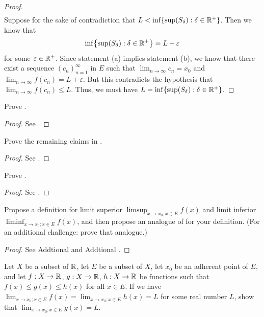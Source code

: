 \begin{proof}
\begin{align*}
  \end{align*}
  Suppose for the sake of contradiction that \(L < \inf\set{\sup(S_\delta) : \delta \in \R^+}\).
  Then we know that
  \[
    \inf\set{\sup(S_\delta) : \delta \in \R^+} = L + \varepsilon
  \]
  for some \(\varepsilon \in \mathbb{R}^+\).
  Since statement (a) implies statement (b), we know that there exist a sequence \((c_n)_{n = 1}^\infty\) in \(E\) such that \(\lim_{n \to \infty} c_n = x_0\) and \(\lim_{n \to \infty} f(c_n) = L + \varepsilon\).
  But this contradicts the hypothesis that \(\lim_{n \to \infty} f(c_n) \leq L\).
  Thus, we must have \(L = \inf\set{\sup(S_{\delta}) : \delta \in \R^+}\).
\end{proof}

\exercisesection

\begin{ex}\label{i:ex:9.3.1}
  Prove .
\end{ex}

\begin{proof}
  See .
\end{proof}

\begin{ex}\label{i:ex:9.3.2}
  Prove the remaining claims in .
\end{ex}

\begin{proof}
  See .
\end{proof}

\begin{ex}\label{i:ex:9.3.3}
  Prove .
\end{ex}

\begin{proof}
  See .
\end{proof}

\begin{ex}\label{i:ex:9.3.4}
  Propose a definition for limit superior \(\limsup_{x \to x_0 ; x \in E} f(x)\) and limit inferior \(\liminf_{x \to x_0 ; x \in E} f(x)\), and then propose an analogue of  for your definition.
  (For an additional challenge: prove that analogue.)
\end{ex}

\begin{proof}
  See Addtional  and Addtional .
\end{proof}

\begin{ex}\label{i:ex:9.3.5}
  Let \(X\) be a subset of \(\mathbb{R}\), let \(E\) be a subset of \(X\), let \(x_0\) be an adherent point of \(E\), and let \(f : X \to \mathbb{R}\), \(g : X \to \mathbb{R}\), \(h : X \to \mathbb{R}\) be functions such that \(f(x) \leq g(x) \leq h(x)\) for all \(x \in E\).
  If we have \(\lim_{x \to x_0 ; x \in E} f(x) = \lim_{x \to x_0 ; x \in E} h(x) = L\) for some real number \(L\), show that \(\lim_{x \to x_0 ; x \in E} g(x) = L\).
\end{ex}

